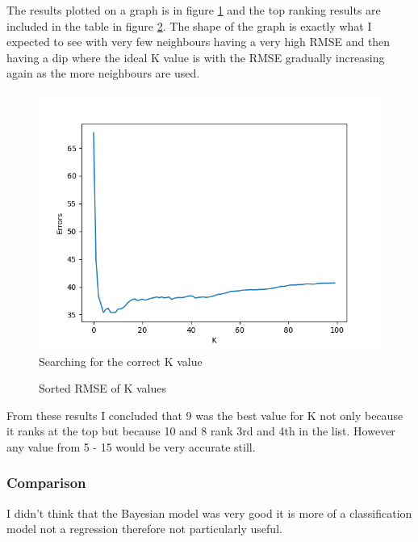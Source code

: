 \documentclass[11pt]{article}
\begin{document}
	The results plotted on a graph is in figure \ref{Img:KSearch} and the top ranking results are included in the table in figure \ref{Img:KSearchRaw}.	
	The shape of the graph is exactly what I expected to see with very few neighbours having a very high RMSE and then having a dip where the ideal K value is with the RMSE gradually increasing again as the more neighbours are used.
	
	\begin{figure}[!htb]
		\begin{center}
			\includegraphics[width=1.2\textwidth]{Resources/PartTwo/searchingForK_20220110_065714.png}
			\caption{Searching for the correct K value}
			\label{Img:KSearch}
		\end{center}
	\end{figure}
	
	\begin{figure}[!htb]
		\begin{center}
			\caption{Sorted RMSE of K values}
			\label{Img:KSearchRaw}
		\end{center}
	\end{figure}

	From these results I concluded that 9 was the best value for K not only because it ranks at the top but because 10 and 8 rank 3rd and 4th in the list. However any value from 5 - 15 would be very accurate still.
	
	\subsubsection{Comparison}
	I didn't think that the Bayesian model was very good it is more of a classification model not a regression therefore not particularly useful.
	
\end{document}
